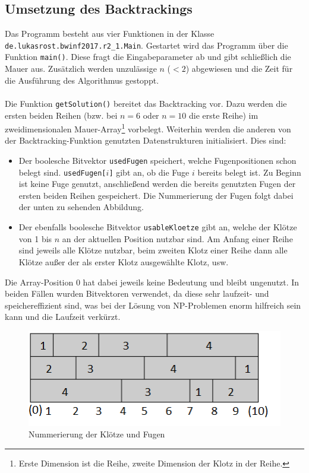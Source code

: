 \documentclass[a4paper, notitlepage, 12pt]{scrartcl}
\begin{document}
\subsection{Umsetzung des Backtrackings}
Das Programm besteht aus vier Funktionen in der Klasse \texttt{de.lukasrost.bwinf2017.r2\_1.Main}. Gestartet wird das Programm über die Funktion \texttt{main()}. Diese fragt die Eingabeparameter ab und gibt schließlich die Mauer aus. Zusätzlich werden unzulässige $n$ ($< 2$) abgewiesen und die Zeit für die Ausführung des Algorithmus gestoppt. \\ \\
Die Funktion \texttt{getSolution()} bereitet das Backtracking vor. Dazu werden die ersten beiden Reihen (bzw. bei $n = 6$ oder $n = 10$ die erste Reihe) im zweidimensionalen Mauer-Array\footnote{Erste Dimension ist die Reihe, zweite Dimension der Klotz in der Reihe.} vorbelegt. Weiterhin werden die anderen von der Backtracking-Funktion genutzten Datenstrukturen initialisiert. Dies sind: 
\begin{itemize}
\item Der boolesche Bitvektor \texttt{usedFugen} speichert, welche Fugenpositionen schon belegt sind. \texttt{usedFugen[$i$]} gibt an, ob die Fuge $i$ bereits belegt ist. Zu Beginn ist keine Fuge genutzt, anschließend werden die bereits genutzten Fugen der ersten beiden Reihen gespeichert. Die Nummerierung der Fugen folgt dabei der unten zu sehenden Abbildung.
\item Der ebenfalls boolesche Bitvektor \texttt{usableKloetze} gibt an, welche der Klötze von 1 bis $n$ an der aktuellen Position nutzbar sind. Am Anfang einer Reihe sind jeweils alle Klötze nutzbar, beim zweiten Klotz einer Reihe dann alle Klötze außer der als erster Klotz ausgewählte Klotz, usw.
\end{itemize}
Die Array-Position $0$ hat dabei jeweils keine Bedeutung und bleibt ungenutzt. In beiden Fällen wurden Bitvektoren verwendet, da diese sehr laufzeit- und speichereffizient sind, was bei der Lösung von NP-Problemen enorm hilfreich sein kann und die Laufzeit verkürzt. \\
\begin{figure}[H]
\begin{center}
\includegraphics[scale=1.0]{pics/mauerBenennung.png}
\caption{Nummerierung der Klötze und Fugen}
\end{center}
\end{figure}
\end{document}
